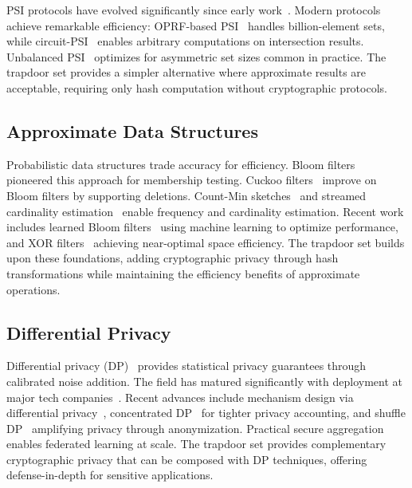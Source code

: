 \documentclass[10pt,conference]{IEEEtran}
\begin{document}
PSI protocols have evolved significantly since early work~\cite{meadows1986more, freedman2004efficient}. Modern protocols achieve remarkable efficiency: OPRF-based PSI~\cite{raghuraman2022blazing} handles billion-element sets, while circuit-PSI~\cite{chandran2022circuit} enables arbitrary computations on intersection results. %
Unbalanced PSI~\cite{chen2017unbalanced} optimizes for asymmetric set sizes common in practice. The trapdoor set provides a simpler alternative where approximate results are acceptable, requiring only hash computation without cryptographic protocols.

\subsection{Approximate Data Structures}

Probabilistic data structures trade accuracy for efficiency. Bloom filters~\cite{bloom1970space} pioneered this approach for membership testing. Cuckoo filters~\cite{fan2014cuckoo} improve on Bloom filters by supporting deletions. %
Count-Min sketches~\cite{cormode2005improved} and streamed cardinality estimation~\cite{ting2014streamed} enable frequency and cardinality estimation. Recent work includes learned Bloom filters~\cite{kraska2018case} using machine learning to optimize performance, and XOR filters~\cite{graf2020xor} achieving near-optimal space efficiency. The trapdoor set builds upon these foundations, adding cryptographic privacy through hash transformations while maintaining the efficiency benefits of approximate operations.

\subsection{Differential Privacy}

Differential privacy (DP)~\cite{dwork2006calibrating} provides statistical privacy guarantees through calibrated noise addition. The field has matured significantly with deployment at major tech companies~\cite{erlingsson2014rappor, apple2017differential}. %
Recent advances include mechanism design via differential privacy~\cite{mcsherry2007exponential}, concentrated DP~\cite{bun2016concentrated} for tighter privacy accounting, and shuffle DP~\cite{erlingsson2019amplification} amplifying privacy through anonymization. Practical secure aggregation~\cite{bonawitz2017practical} enables federated learning at scale. The trapdoor set provides complementary cryptographic privacy that can be composed with DP techniques, offering defense-in-depth for sensitive applications.
\end{document}
